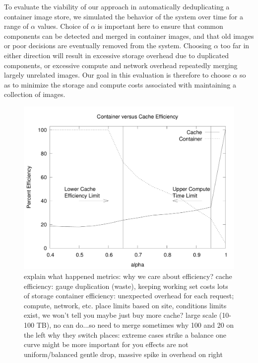 \documentclass[sigconf]{acmart}
\begin{document}
To evaluate the viability of our approach in automatically deduplicating a container image store,
we simulated the behavior of the system over time for a range of $\alpha$ values.
Choice of $\alpha$ is important here to ensure that common components can be detected and merged in container images,
and that old images or poor decisions are eventually removed from the system.
Choosing $\alpha$ too far in either direction will result in excessive storage overhead due to duplicated components,
or excessive compute and network overhead repeatedly merging largely unrelated images.
Our goal in this evaluation is therefore to choose $\alpha$ so as to minimize the storage and compute costs associated with maintaining a collection of images.

\begin{figure}
\includegraphics[width=\linewidth]{curated/comparative/distribution_efficiency.pdf}
\label{fig:dist-eff}
explain what happened
metrics: why we care about efficiency?
cache efficiency: gauge duplication (waste), keeping working set costs lots of storage
container efficiency: unexpected overhead for each request; compute, network, etc.
place limits based on site, conditions
limits exist, we won't tell you
maybe just buy more cache?
large scale (10-100 TB), no can do...so need to merge sometimes
why 100 and 20 on the left
why they switch places: extreme cases
strike a balance
one curve might be more important for you
effects are not uniform/balanced gentle drop, massive spike in overhead on right
\fi
\end{figure}
\end{document}
